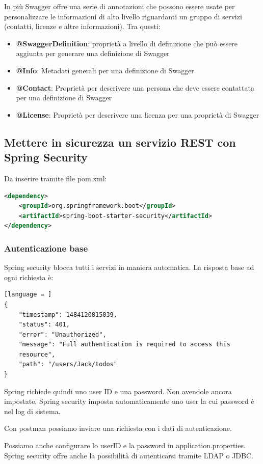 \documentclass[11pt,a4paper]{book}
\begin{document}
In più Swagger offre una serie di annotazioni che possono essere usate per personalizzare le informazioni di alto livello riguardanti un gruppo di servizi (contatti, licenze e altre informazioni). Tra questi:
\begin{itemize}
	\item \textbf{@SwaggerDefinition}: proprietà a livello di definizione che può essere aggiunta per generare una definizione di Swagger
	\item \textbf{@Info}: Metadati generali per una definizione di Swagger
	\item \textbf{@Contact}: Proprietà per descrivere una persona che deve essere contattata per una definizione di Swagger
	\item \textbf{@License}: Proprietà per descrivere una licenza per una proprietà di Swagger
\end{itemize}

\subsection{Mettere in sicurezza un servizio REST con Spring Security}
Da inserire tramite file pom.xml:
\begin{lstlisting}[language = XML]
<dependency>
	<groupId>org.springframework.boot</groupId>
	<artifactId>spring-boot-starter-security</artifactId>
</dependency>
\end{lstlisting}

\subsubsection{Autenticazione base}
Spring security blocca tutti i servizi in maniera automatica. La risposta base ad ogni richiesta è:
\begin{lstlisting}[language = ]
{
	"timestamp": 1484120815039,
	"status": 401,
	"error": "Unauthorized",
	"message": "Full authentication is required to access this
	resource",
	"path": "/users/Jack/todos"
}
\end{lstlisting}

Spring richiede quindi uno user ID e una password. Non avendole ancora impostate, Spring security imposta automaticamente uno user la cui password è nel log di sistema.

Con postman possiamo inviare una richiesta con i dati di autenticazione.

Possiamo anche configurare lo userID e la password in application.properties. Spring security offre anche la possibilità di autenticarsi tramite LDAP o JDBC.
\end{document}
